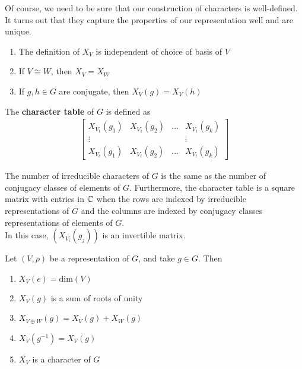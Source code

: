\documentclass{memoir}
\begin{document}


Of course, we need to be sure that our construction of characters is well-defined. It turns out that they capture the properties of our representation well and are unique.

\begin{prop}
	\begin{enumerate}
		\item The definition of \(X_V\) is independent of choice of basis of \(V\)
		\item If \(V \cong W\), then \(X_V = X_W\) 
		\item If \(g,h \in G\) are conjugate, then \(X_V(g) = X_V(h)\)
	\end{enumerate}
\end{prop}

\begin{defn}
	The \textbf{character table} of \(G\) is defined as
	\begin{align*}
		\begin{bmatrix} X_{V_1}(g_1) & X_{V_1}(g_2) & \ldots & X_{V_1}(g_k)\\
		\vdots & & & \vdots \\
	X_{V_\ell}(g_1) & X_{V_\ell}(g_2) & \ldots & X_{V_\ell}(g_k)\end{bmatrix} 
	\end{align*}
\end{defn}
The number of irreducible characters of \(G\) is the same as the number of conjugacy classes of elements of \(G\). Furthermore, the character table is a square matrix with entries in \(\mathbb{C}\) when the rows are indexed by irreducible representations of \(G\) and the columns are indexed by conjugacy classes representations of elements of \(G\).\\

In this case, \((X_{V_i}(g_j))\) is an invertible matrix.


\begin{prop}
	Let \((V,\rho )\) be a representation of \(G\), and take \(g \in G\). Then
	\begin{enumerate}
		\item \(X_V(e) = \textrm{dim}(V)\) 
		\item \(X_V(g)\) is a sum of roots of unity
		\item \(X_{V\oplus W}(g) = X_{V}(g) + X_{W}(g)\)
		\item \(X_V(g^{-1}) = \overline{X_V(g)}\) 
		\item \(\overline{X_V}\) is a character of \(G\)
	\end{enumerate}
\end{prop}
\end{document}
